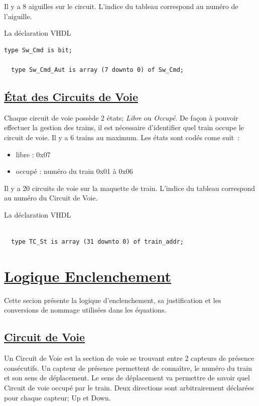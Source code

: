 Il y a 8 aiguilles sur le circuit. L'indice du tableau correspond au
numéro de l'aiguille.

\medskip
La déclaration VHDL
\begin{lstlisting}[style=vhdl]
  type Sw_Cmd is bit;
  
  type Sw_Cmd_Aut is array (7 downto 0) of Sw_Cmd;
\end{lstlisting}


  
\subsection{\underline{\'Etat des Circuits de Voie}}
\label{sec:st_sig}

Chaque circuit de voie possède 2 états; \emph{Libre} ou
\emph{Occupé}. De façon à pouvoir effectuer la gestion des trains, il
est nécessaire d'identifier quel train occupe le circuit de voie.  Il
y a 6 trains au maximum. Les états sont codés come suit~:
\begin{itemize}
  \item libre : 0x07
  \item occupé : numéro du train 0x01 à 0x06
\end{itemize}  

Il y a 20 circuits de voie sur la maquette de train. L'indice du
tableau correspond au numéro du Circuit de Voie.

\medskip
La déclaration VHDL
\begin{lstlisting}[style=vhdl]
  
  type TC_St is array (31 downto 0) of train_addr;
\end{lstlisting}




\newpage
\section{\underline{Logique Enclenchement}}
\label{sec:log_enc}

Cette secion présente la logique d'enclenchement, sa justification et
les conversions de nommage utilisées dans les équations.

\subsection{\underline{Circuit de Voie}}
\label{sec:CdV}

Un Circuit de Voie est la section de voie se trouvant entre 2 capteurs
de présence consécutifs. Un capteur de présence permettent de
connaître, le numéro du train et son sens de déplacement. Le sens de
déplacement va permettre de savoir quel Circuit de voie occupé par le
train. Deux directions sont arbitrairement déclarées pour chaque
capteur; Up et Down.

